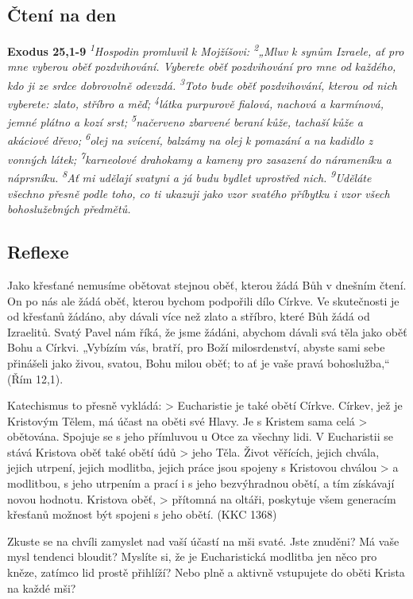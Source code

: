 \documentclass[11pt]{article}
\begin{document}
\subsection*{Čtení na den}
\textbf{Exodus 25,1-9}
\newline
\textit{
\textsuperscript{1}Hospodin promluvil k Mojžíšovi:
\textsuperscript{2}„Mluv k synům Izraele, ať pro mne vyberou oběť pozdvihování. Vyberete oběť pozdvihování pro mne od každého, kdo ji ze srdce dobrovolně odevzdá.
\textsuperscript{3}Toto bude oběť pozdvihování, kterou od nich vyberete: zlato, stříbro a měď;
\textsuperscript{4}látka purpurově fialová, nachová a karmínová, jemné plátno a kozí srst;
\textsuperscript{5}načerveno zbarvené beraní kůže, tachaší kůže a akáciové dřevo;
\textsuperscript{6}olej na svícení, balzámy na olej k pomazání a na kadidlo z vonných látek;
\textsuperscript{7}karneolové drahokamy a kameny pro zasazení do nárameníku a náprsníku.
\textsuperscript{8}Ať mi udělají svatyni a já budu bydlet uprostřed nich.
\textsuperscript{9}Uděláte všechno přesně podle toho, co ti ukazuji jako vzor svatého příbytku i vzor všech bohoslužebných předmětů.
}

\subsection*{Reflexe}
Jako křesťané nemusíme obětovat stejnou oběť, kterou žádá Bůh v dnešním čtení. On po nás ale žádá oběť, kterou bychom
podpořili dílo Církve. Ve skutečnosti je od křesťanů žádáno, aby dávali více než zlato a stříbro, které Bůh žádá od Izraelitů. Svatý
Pavel nám říká, že jsme žádáni, abychom dávali svá těla jako oběť Bohu a Církvi. „Vybízím vás, bratří, pro Boží milosrdenství,
abyste sami sebe přinášeli jako živou, svatou, Bohu milou oběť; to ať je vaše pravá bohoslužba,“ (Řím 12,1).

Katechismus to přesně vykládá:
> Eucharistie je také obětí Církve. Církev, jež je Kristovým Tělem, má účast na oběti své Hlavy. Je s Kristem sama celá
> obětována. Spojuje se s jeho přímluvou u Otce za všechny lidi. V Eucharistii se stává Kristova oběť také obětí údů
> jeho Těla. Život věřících, jejich chvála, jejich utrpení, jejich modlitba, jejich práce jsou spojeny s Kristovou chválou
> a modlitbou, s jeho utrpením a prací i s jeho bezvýhradnou obětí, a tím získávají novou hodnotu. Kristova oběť,
> přítomná na oltáři, poskytuje všem generacím křesťanů možnost být spojeni s jeho obětí. (KKC 1368)

Zkuste se na chvíli zamyslet nad vaší účastí na mši svaté. Jste znuděni? Má vaše mysl tendenci bloudit? Myslíte si, že je
Eucharistická modlitba jen něco pro kněze, zatímco lid prostě přihlíží? Nebo plně a aktivně vstupujete do oběti Krista na každé
mši?
\end{document}
